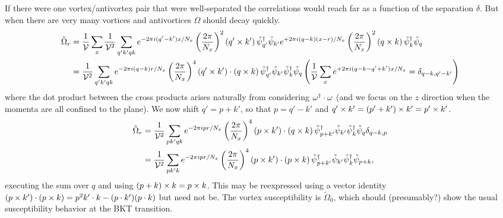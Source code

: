 If there were one vortex/antivortex pair that were well-separated the correlations would reach far as a function of the separation $\delta$.
But when there are very many vortices and antivortices $\Omega$ should decay quickly.
\begin{align}
	\tilde{\Omega}_{r}
	&=
	\frac{1}{\mathcal{V}} \sum_{x}
	\frac{1}{\mathcal{V}^2} \sum_{q'k'qk}
		e^{-2\pi i(q'-k')x/N_x} \left(\frac{2\pi}{N_x}\right)^2 (q' \times k')\, \tilde{\psi}{}^{\dagger}_{q'} \tilde{\psi}_{k'}
		e^{+2\pi i(q-k)(x-r)/N_x} \left(\frac{2\pi}{N_x}\right)^2 (q \times k)\, \tilde{\psi}{}^{\dagger}_{k} \tilde{\psi}_q
	\nonumber\\
	&=
	\frac{1}{\mathcal{V}^2} \sum_{q'k'qk}
		e^{-2\pi i(q-k)r/N_x} \left(\frac{2\pi}{N_x}\right)^4 (q' \times k')\cdot(q \times k)\,
		\tilde{\psi}{}^{\dagger}_{q'} \tilde{\psi}_{k'}
		\tilde{\psi}{}^{\dagger}_{k} \tilde{\psi}_q
		\left(\frac{1}{\mathcal{V}} \sum_{x}
			e^{+2\pi i(q-k-q'+k') x / N_x}
			= \delta_{q-k,q'-k'}
			\right)
\end{align}
where the dot product between the cross products arises naturally from considering $\omega{}^{\dagger} \cdot \omega$ (and we focus on the $z$ direction when the momenta are all confined to the plane).
We now shift $q' = p+k'$, so that $p=q'-k'$ and $q'\times k' = (p'+k')\times k' = p' \times k'$.
\begin{align}
	\tilde{\Omega}_{r}
	&=
	\frac{1}{\mathcal{V}^2} \sum_{pk'qk}
		e^{-2\pi ipr/N_x} \left(\frac{2\pi}{N_x}\right)^4 (p \times k')\cdot(q \times k)\,
		\tilde{\psi}{}^{\dagger}_{p+k'} \tilde{\psi}_{k'}
		\tilde{\psi}{}^{\dagger}_{k} \tilde{\psi}_q
		\delta_{q-k,p}
	\nonumber\\
	&=
	\frac{1}{\mathcal{V}^2} \sum_{pk'k}
		e^{-2\pi ipr/N_x} \left(\frac{2\pi}{N_x}\right)^4 (p \times k')\cdot(p \times k)\,
		\tilde{\psi}{}^{\dagger}_{p+k'} \tilde{\psi}_{k'}
		\tilde{\psi}{}^{\dagger}_{k} \tilde{\psi}_{p+k},
	\label{eq:vorticity-vorticity}
\end{align}
executing the sum over $q$ and using $(p+k)\times k = p\times k$.
This may be reexpressed using a vector identity $(p \times k')\cdot(p \times k) = p^2 k' \cdot k - (p \cdot k')(p \cdot k)$ but need not be.
The vortex susceptibility is $\tilde{\Omega}_0$, which should (presumably?) show the usual susceptibility behavior at the BKT transition.

